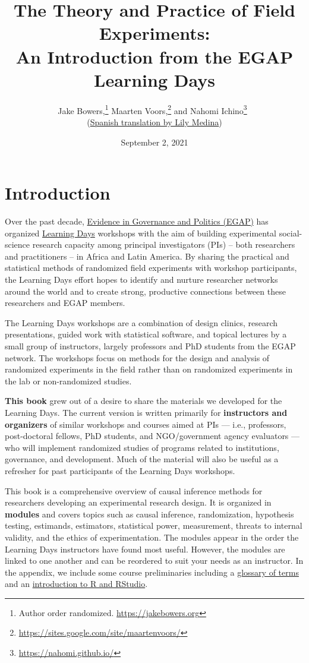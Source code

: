 \documentclass[12pt,]{book}
\title{The Theory and Practice of Field Experiments:\\
An Introduction from the EGAP Learning Days}
\author{Jake Bowers,\footnote{Author order randomized. \url{https://jakebowers.org}} Maarten Voors,\footnote{\url{https://sites.google.com/site/maartenvoors/}} and Nahomi Ichino\footnote{\url{https://nahomi.github.io/}}~\\
(\href{https://egap.github.io/theory_and_practice_of_field_experiments_spanish/}{Spanish translation by Lily Medina})}
\date{September 2, 2021}
\begin{document}
\maketitle

\captionsetup[table]{list=no}
\captionsetup[figure]{list=no}

{
\hypersetup{linkcolor=}
\setcounter{tocdepth}{1}
\tableofcontents
}
\hypertarget{introduction}{%
\chapter{Introduction}\label{introduction}}

Over the past decade, \href{http://egap.org/}{Evidence in Governance and Politics (EGAP)} has organized \href{https://egap.org/learning-days/}{Learning Days} workshops with the aim of building experimental social-science research capacity among principal investigators (PIs) -- both researchers and practitioners -- in Africa and Latin America. By sharing the practical and statistical methods of randomized field experiments with workshop participants, the Learning Days effort hopes to identify and nurture researcher networks around the world and to create strong, productive connections between these researchers and EGAP members.

The Learning Days workshops are a combination of design clinics, research presentations, guided work with statistical software, and topical lectures by a small group of instructors, largely professors and PhD students from the EGAP network. The workshops focus on methods for the design and analysis of randomized experiments in the field rather than on randomized experiments in the lab or non-randomized studies.

\textbf{This book} grew out of a desire to share the materials we developed for the Learning Days. The current version is written primarily for \textbf{instructors and organizers} of similar workshops and courses aimed at PIs --- i.e., professors, post-doctoral fellows, PhD students, and NGO/government agency evaluators --- who will implement randomized studies of programs related to institutions, governance, and development. Much of the material will also be useful as a refresher for past participants of the Learning Days workshops.

This book is a comprehensive overview of causal inference methods for researchers developing an experimental research design. It is organized in \textbf{modules} and covers topics such as causal inference, randomization, hypothesis testing, estimands, estimators, statistical power, measurement, threats to internal validity, and the ethics of experimentation. The modules appear in the order the Learning Days instructors have found most useful. However, the modules are linked to one another and can be reordered to suit your needs as an instructor. In the appendix, we include some course preliminaries including a \href{glossary-of-terms.html}{glossary of terms} and an \href{introduction-to-r-and-rstudio.html}{introduction to R and RStudio}.
\end{document}
